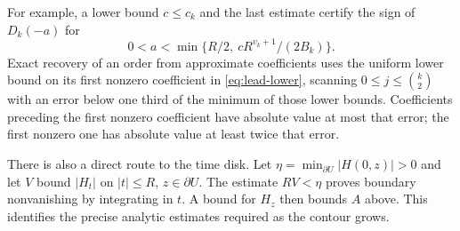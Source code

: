 For example, a lower bound $c\le c_k$ and the last estimate certify the sign of $D_k(-a)$ for
\[
 0<a<\min\{R/2,\ cR^{v_k+1}/(2B_k)\}.
\]
Exact recovery of an order from approximate coefficients uses the uniform lower bound on its first nonzero coefficient in \eqref{eq:lead-lower}, scanning $0\le j\le\binom{k}{2}$ with an error below one third of the minimum of those lower bounds. Coefficients preceding the first nonzero coefficient have absolute value at most that error; the first nonzero one has absolute value at least twice that error.

There is also a direct route to the time disk. Let $\eta=\min_{\partial U}|H(0,z)|>0$ and let $V$ bound $|H_t|$ on $|t|\le R$, $z\in\partial U$. The estimate $RV<\eta$ proves boundary nonvanishing by integrating in $t$. A bound for $H_z$ then bounds $A$ above. This identifies the precise analytic estimates required as the contour grows.
